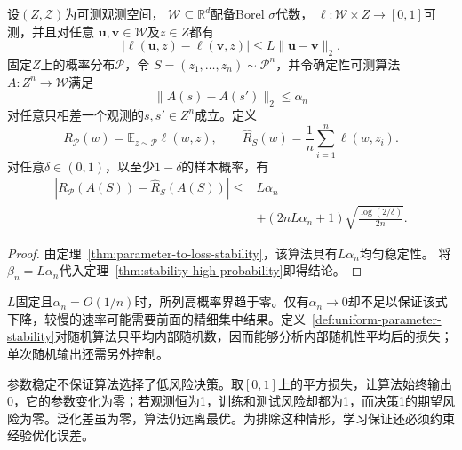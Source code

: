 \begin{theorem}[均匀参数稳定性的高概率泛化界]
\label{thm:parameter-high-probability}
设$(Z,\mathcal Z)$为可测观测空间，
$\mathcal W\subseteq\mathbb R^d$配备Borel $\sigma$代数，
$\ell:\mathcal W\times Z\to[0,1]$可测，并且对任意
$\bm u,\bm v\in\mathcal W$及$z\in Z$都有
\[
 |\ell(\bm u,z)-\ell(\bm v,z)|
 \leq L\|\bm u-\bm v\|_2.
\]
固定$Z$上的概率分布$\mathcal P$，令
$S=(z_1,\ldots,z_n)\sim\mathcal P^n$，并令确定性可测算法
$A:Z^n\to\mathcal W$满足
\[
 \|A(s)-A(s')\|_2\leq\alpha_n
\]
对任意只相差一个观测的$s,s'\in Z^n$成立。定义
\[
 R_{\mathcal P}(w)=\mathbb E_{z\sim\mathcal P}\ell(w,z),
 \qquad
 \hat R_S(w)=\frac1n\sum_{i=1}^n\ell(w,z_i).
\]
对任意$\delta\in(0,1)$，以至少$1-\delta$的样本概率，有
\begin{align*}
 |R_{\mathcal P}(A(S))-\hat R_S(A(S))|
 \leq{}&L\alpha_n\\
 &+(2nL\alpha_n+1)\sqrt{\frac{\log(2/\delta)}{2n}}.
\end{align*}
\end{theorem}
\begin{proof}
由定理~\ref{thm:parameter-to-loss-stability}，该算法具有$L\alpha_n$均匀稳定性。
将$\beta_n=L\alpha_n$代入定理~\ref{thm:stability-high-probability}即得结论。
\end{proof}

$L$固定且$\alpha_n=O(1/n)$时，所列高概率界趋于零。仅有$\alpha_n\to0$却不足以保证该式下降，较慢的速率可能需要前面的精细集中结果。定义~\ref{def:uniform-parameter-stability}对随机算法只平均内部随机数，因而能够分析内部随机性平均后的损失；单次随机输出还需另外控制。

参数稳定不保证算法选择了低风险决策。取$[0,1]$上的平方损失，让算法始终输出0，它的参数变化为零；若观测恒为1，训练和测试风险却都为1，而决策1的期望风险为零。泛化差虽为零，算法仍远离最优。为排除这种情形，学习保证还必须约束经验优化误差。

